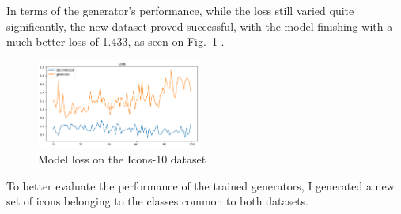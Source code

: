 In terms of the generator's performance, while the loss still varied quite significantly, the new dataset proved successful, with the model finishing with a much better loss of 1.433, as seen on Fig.~\ref{fig:Icons10Loss} .

\begin{figure}[htbp]
    \centering
    \includegraphics[width=0.48\textwidth]{images/icons10/icons10_loss}
    \caption{Model loss on the Icons-10 dataset}
    \label{fig:Icons10Loss}
\end{figure}

To better evaluate the performance of the trained generators, I generated a new set of icons belonging to the classes common to both datasets.

